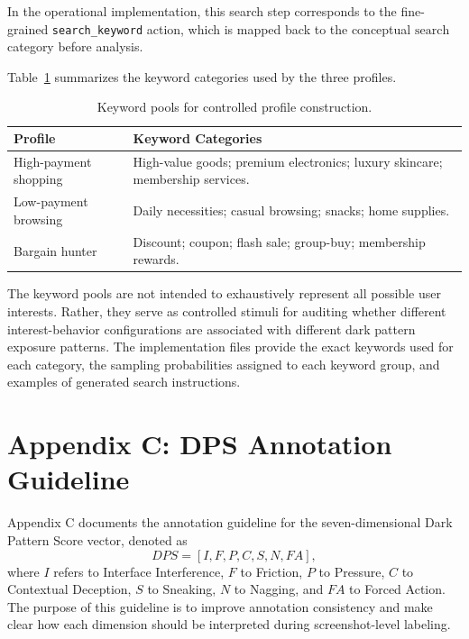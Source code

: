 In the operational implementation, this search step corresponds to the fine-grained \texttt{search\_keyword} action, which is mapped back to the conceptual \(\mathrm{search}\) category before analysis.

Table~\ref{tab:keyword-pools} summarizes the keyword categories used by the three profiles.

\begin{table}[htbp]
    \centering
    \caption{Keyword pools for controlled profile construction.}
    \label{tab:keyword-pools}
    \begin{tabular}{lp{9cm}}
        \toprule
        \textbf{Profile} & \textbf{Keyword Categories} \\
        \midrule
        High-payment shopping & 
        High-value goods; premium electronics; luxury skincare; membership services. \\
        \addlinespace
        Low-payment browsing & 
        Daily necessities; casual browsing; snacks; home supplies. \\
        \addlinespace
        Bargain hunter & 
        Discount; coupon; flash sale; group-buy; membership rewards. \\
        \bottomrule
    \end{tabular}
\end{table}

The keyword pools are not intended to exhaustively represent all possible user interests. Rather, they serve as controlled stimuli for auditing whether different interest-behavior configurations are associated with different dark pattern exposure patterns. The implementation files provide the exact keywords used for each category, the sampling probabilities assigned to each keyword group, and examples of generated search instructions.

\section{Appendix C: DPS Annotation Guideline}
\label{app:dps-annotation-guideline}

Appendix C documents the annotation guideline for the seven-dimensional Dark Pattern Score vector, denoted as
\[
DPS = [I, F, P, C, S, N, FA],
\]
where \(I\) refers to Interface Interference, \(F\) to Friction, \(P\) to Pressure, \(C\) to Contextual Deception, \(S\) to Sneaking, \(N\) to Nagging, and \(FA\) to Forced Action. The purpose of this guideline is to improve annotation consistency and make clear how each dimension should be interpreted during screenshot-level labeling.

